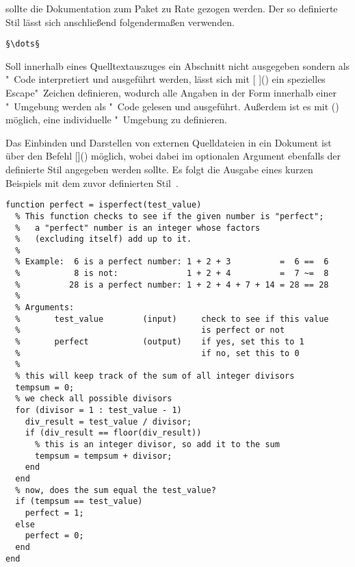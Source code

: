 \documentclass[%
  english,ngerman,%
  cdgeometry=no,DIV=12,%
  automark,%
  listof=toc,%
]{tudscrartcl}
\begin{document}
sollte die Dokumentation zum Paket zu Rate gezogen werden. Der so definierte 
Stil lässt sich anschließend folgendermaßen verwenden.
%
\begin{Hint}
\begin{lstlisting}[style=matlab]
§\dots§
\end{lstlisting}
\end{Hint}
%
Soll innerhalb eines Quelltextauszuges ein Abschnitt nicht ausgegeben sondern 
als "~Code interpretiert und ausgeführt werden, lässt sich mit 
[%
]() ein spezielles Escape"~Zeichen definieren, wodurch alle 
Angaben in der Form \PValue{\dots} innerhalb 
einer "~Umgebung werden als "~Code gelesen und 
ausgeführt. Außerdem ist es mit () 
möglich, eine individuelle "~Umgebung zu definieren.

Das Einbinden und Darstellen von externen Quelldateien in ein Dokument ist über 
den Befehl
[\LParameter{}]() 
möglich, wobei dabei im optionalen Argument ebenfalls der definierte Stil 
angegeben werden sollte. Es folgt die Ausgabe eines kurzen Beispiels mit dem 
zuvor definierten Stil~.
%
\begin{lstlisting}[style=matlab]
function perfect = isperfect(test_value)
  % This function checks to see if the given number is "perfect";
  %   a "perfect" number is an integer whose factors 
  %   (excluding itself) add up to it.
  %
  % Example:  6 is a perfect number: 1 + 2 + 3          =  6 ==  6
  %           8 is not:              1 + 2 + 4          =  7 ~=  8
  %          28 is a perfect number: 1 + 2 + 4 + 7 + 14 = 28 == 28
  %
  % Arguments:
  %       test_value        (input)     check to see if this value 
  %                                     is perfect or not
  %       perfect           (output)    if yes, set this to 1
  %                                     if no, set this to 0
  %
  % this will keep track of the sum of all integer divisors
  tempsum = 0;
  % we check all possible divisors
  for (divisor = 1 : test_value - 1)
    div_result = test_value / divisor;
    if (div_result == floor(div_result)) 
      % this is an integer divisor, so add it to the sum
      tempsum = tempsum + divisor;
    end
  end
  % now, does the sum equal the test_value?
  if (tempsum == test_value) 
    perfect = 1;
  else
    perfect = 0;
  end
end
\end{lstlisting}
\end{document}
